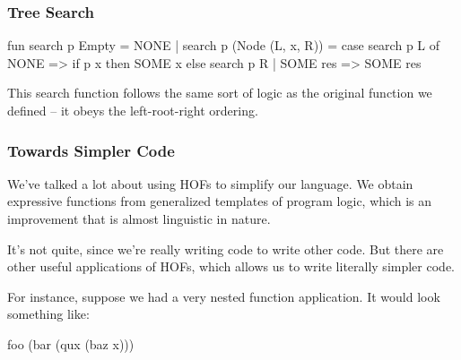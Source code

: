 \documentclass[aspectratio=169]{beamer}
\begin{document}
\begin{frame}[fragile]
  \frametitle{Tree Search}

  \rprs

  \begin{codeblock}
    fun search p Empty = NONE
      | search p (Node (L, x, R)) = 
        case search p L of
          NONE => 
            if p x then SOME x 
            else search p R 
        | SOME res => SOME res
  \end{codeblock}

  \vspace{\fill}

  This search function follows the same sort of logic as the original
   function we defined -- it obeys the left-root-right ordering.
\end{frame}


\begin{frame}[fragile]
  \frametitle{Towards Simpler Code}

  We've talked a lot about using HOFs to simplify our language. We obtain expressive 
  functions from generalized templates of program logic, which is an improvement that
  is almost linguistic in nature.

  \pause
  \vspace{\fill}

  It's not quite, since we're really writing code to write other code. But there are
  other useful applications of HOFs, which allows us to write literally simpler code.

  \pause
  \vspace{\fill}

  For instance, suppose we had a very nested function application. It would look
  something like:

  \begin{codeblock}
    foo (bar (qux (baz x)))
  \end{codeblock}
\end{frame}
\end{document}
